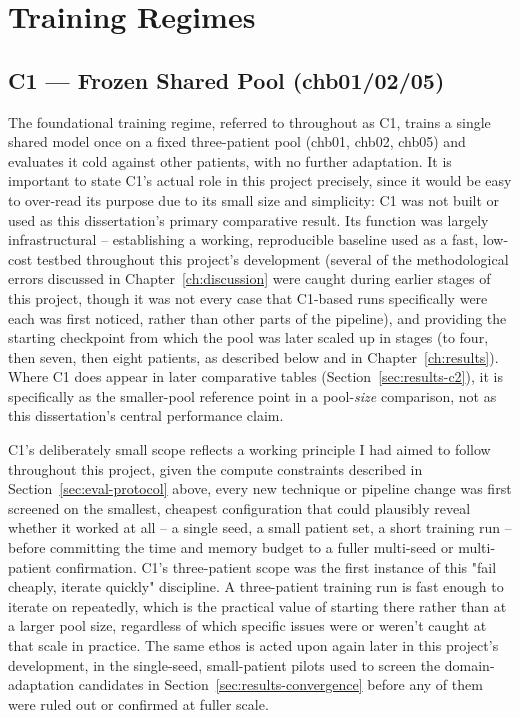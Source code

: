 \section{Training Regimes}

\subsection{C1 --- Frozen Shared Pool (chb01/02/05)}

The foundational training regime, referred to throughout as C1, trains a single shared model once on a fixed three-patient pool (chb01, chb02, chb05) and evaluates it cold against 
other patients, with no further adaptation. It is important to state C1's actual role in this project precisely, since it would be easy to over-read its purpose due to its small size and simplicity:
C1 was not built or used as this dissertation's primary comparative result. Its function was largely infrastructural -- establishing a working, reproducible baseline used as a fast, 
low-cost testbed throughout this project's development (several of the methodological errors discussed in Chapter~\ref{ch:discussion} were caught during earlier stages of this project, 
though it was not every case that C1-based runs specifically were each was first noticed, rather than other parts of the pipeline), and providing the starting checkpoint 
from which the pool was later scaled up in stages (to four, then seven, then eight patients, as described below and in Chapter~\ref{ch:results}). Where C1 does appear in later comparative 
tables (Section~\ref{sec:results-c2}), it is specifically as the smaller-pool reference point in a pool-\emph{size} comparison, not as this dissertation's central performance claim.

C1's deliberately small scope reflects a working principle I had aimed to follow throughout this project, given the 
compute constraints described in Section~\ref{sec:eval-protocol} above, every new technique or pipeline change was first screened on the smallest, cheapest configuration that could 
plausibly reveal whether it worked at all -- a single seed, a small patient set, a short training run -- before committing the time and memory budget to a fuller multi-seed or 
multi-patient confirmation. C1's three-patient scope was the first instance of this "fail cheaply, iterate quickly" discipline. A three-patient training run is fast enough to iterate 
on repeatedly, which is the practical value of starting there rather than at a larger pool size, regardless of which specific issues were or weren't caught at that scale in practice. 
The same ethos is acted upon again later in this project's development, in the single-seed, small-patient pilots used to screen the domain-adaptation candidates in 
Section~\ref{sec:results-convergence} before any of them were ruled out or confirmed at fuller scale.

